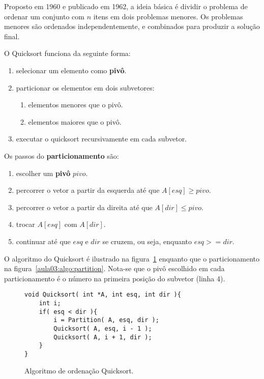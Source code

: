 Proposto em 1960 e publicado em 1962, a ideia básica é dividir o problema de
ordenar um conjunto com $n$ itens em dois problemas menores.
Os problemas menores são ordenados independentemente, e combinados para
produzir a solução final.

O Quicksort funciona da seguinte forma:
\begin{enumerate}
\item selecionar um elemento como {\bf pivô}.
\item particionar os elementos em dois subvetores:
	\begin{enumerate}
	\item elementos menores que o pivô.
	\item elementos maiores que o pivô.
	\end{enumerate}
\item executar o quicksort recursivamente em cada subvetor.
\end{enumerate}

Os passos do {\bf particionamento} são:
\begin{enumerate}
\item escolher um {\bf pivô} $pivo$.
\item percorrer o vetor a partir da esquerda até que $A[esq] \geq pivo$.
\item percorrer o vetor a partir da direita até que $A[dir] \leq pivo$.
\item trocar $A[esq]$ com $A[dir]$.
\item continuar até que $esq$ e $dir$ se cruzem, ou seja, enquanto $esq >= dir$.
\end{enumerate}


O algoritmo do Quicksort é ilustrado na figura~\ref{aula03:algo:quicksort}
enquanto que o particionamento na figura~\ref{aula03:algo:partition}.
Nota-se que o pivô escolhido em cada particionamento é o número 
na primeira posição do subvetor (linha 4).
%
\begin{figure}[!htb]
\centering
\begin{framed}
\begin{lstlisting}
void Quicksort( int *A, int esq, int dir ){
	int i;
	if( esq < dir ){
		i = Partition( A, esq, dir );
		Quicksort( A, esq, i - 1 );
		Quicksort( A, i + 1, dir );
	}
}
\end{lstlisting}
\end{framed}
\caption{Algoritmo de ordenação Quicksort.}
\label{aula03:algo:quicksort}
\end{figure}

